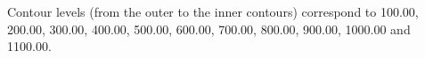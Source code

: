 Contour levels (from the outer to the inner contours) correspond to 100.00, 200.00, 300.00, 400.00, 500.00, 600.00, 700.00, 800.00, 900.00, 1000.00 and 1100.00.
